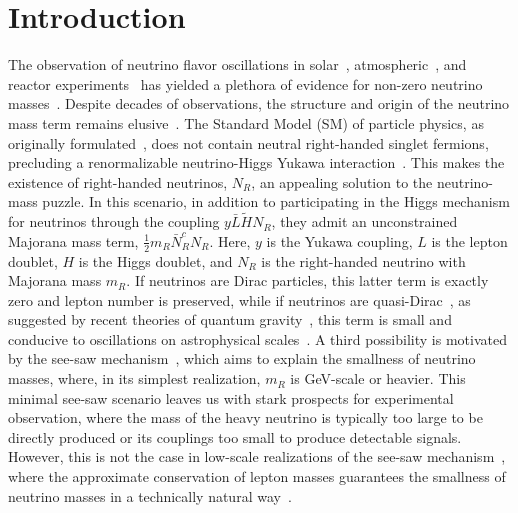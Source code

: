 \documentclass[
    aps,
    prd,
    reprint,
    amsmath,
    amssymb,
    nofootinbib,
    superscriptaddress,
    floatfix
]{revtex4-2}
\begin{document}
\section{\label{sec:introduction}Introduction}

The observation of neutrino flavor oscillations in solar~\cite{Cleveland:1998nv, Super-Kamiokande:2001ljr, Borexino:2008dzn, Gann:2021ndb}, atmospheric~\cite{Super-Kamiokande:1998kpq, IceCube:2013pav, ANTARES:2018rtf, IceCubeCollaboration:2023wtb, Arguelles:2022hrt}, and reactor experiments~\cite{DayaBay:2012fng, RENO:2012mkc, Vogel:2015wua} has yielded a plethora of evidence for non-zero neutrino masses~\cite{Esteban:2018azc}.
Despite decades of observations, the structure and origin of the neutrino mass term remains elusive~\cite{Mohapatra:2005wg}.
The Standard Model (SM) of particle physics, as originally formulated~\cite{Weinberg:1967tq, Weinberg:2004kv}, does not contain neutral right-handed singlet fermions, precluding a renormalizable neutrino-Higgs Yukawa interaction~\cite{Higgs:1964pj}.
This makes the existence of right-handed neutrinos, $N_R$, an appealing solution to the neutrino-mass puzzle.
In this scenario, in addition to participating in the Higgs mechanism for neutrinos through the coupling $y \bar L \tilde H N_R$, they admit an unconstrained Majorana mass term, $\frac{1}{2} m_R \bar N_R^c N_R$.
Here, $y$ is the Yukawa coupling, $L$ is the lepton doublet, $H$ is the Higgs doublet, and $N_R$ is the right-handed neutrino with Majorana mass $m_R$.
If neutrinos are Dirac particles, this latter term is exactly zero and lepton number is preserved, while if neutrinos are quasi-Dirac~\cite{Valle:1983dk}, as suggested by recent theories of quantum gravity~\cite{Ooguri:2016pdq, Arkani-Hamed:2007ryu, Gonzalo:2021zsp, Vafa:2024fpx}, this term is small and conducive to oscillations on astrophysical scales~\cite{Crocker:2001zs, Keranen:2003xd,Beacom:2003eu, Esmaili:2009fk, Esmaili:2012ac, Shoemaker:2015qul, Carloni:2022cqz}.
A third possibility is motivated by the see-saw mechanism~\cite{Minkowski:1977sc, Mohapatra:1979ia, GellMann:1980vs, Yanagida:1979as, Lazarides:1980nt, Mohapatra:1980yp, Schechter:1980gr, Cheng:1980qt, Foot:1988aq}, which aims to explain the smallness of neutrino masses, where, in its simplest realization, $m_R$ is GeV-scale or heavier.
This minimal see-saw scenario leaves us with stark prospects for experimental observation, where the mass of the heavy neutrino is typically too large to be directly produced or its couplings too small to produce detectable signals.
However, this is not the case in low-scale realizations of the see-saw mechanism~\cite{Mohapatra:1986bd, GonzalezGarcia:1988rw,Wyler:1982dd, Akhmedov:1995ip, Akhmedov:1995vm,Barry:2011wb, Zhang:2011vh}, where the approximate conservation of lepton masses guarantees the smallness of neutrino masses in a technically natural way~\cite{naturalness_tHooft, Vissani:1997ys}.
\end{document}

